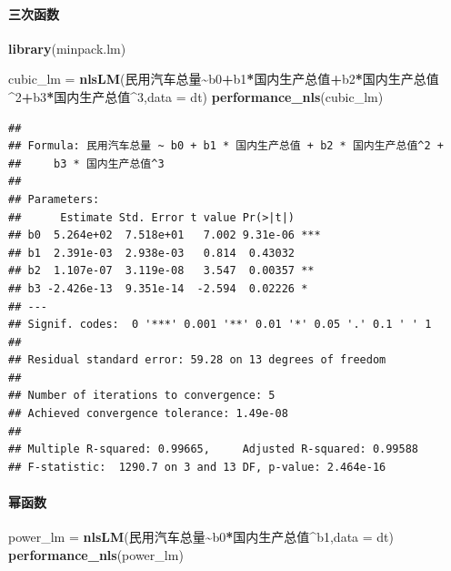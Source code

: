 \documentclass[
]{article}
\newenvironment{Shaded}{\begin{snugshade}}{\end{snugshade}}
\newcommand{\AttributeTok}[1]{\textcolor[rgb]{0.13,0.29,0.53}{#1}}
\newcommand{\DecValTok}[1]{\textcolor[rgb]{0.00,0.00,0.81}{#1}}
\newcommand{\FunctionTok}[1]{\textcolor[rgb]{0.13,0.29,0.53}{\textbf{#1}}}
\newcommand{\NormalTok}[1]{#1}
\newcommand{\OtherTok}[1]{\textcolor[rgb]{0.56,0.35,0.01}{#1}}
\newcommand{\SpecialCharTok}[1]{\textcolor[rgb]{0.81,0.36,0.00}{\textbf{#1}}}
\begin{document}
\paragraph{三次函数}\label{ux4e09ux6b21ux51fdux6570}

\begin{Shaded}
\begin{Highlighting}[]
\FunctionTok{library}\NormalTok{(minpack.lm)}

\NormalTok{cubic\_lm }\OtherTok{=} \FunctionTok{nlsLM}\NormalTok{(民用汽车总量}\SpecialCharTok{\textasciitilde{}}\NormalTok{b0}\SpecialCharTok{+}\NormalTok{b1}\SpecialCharTok{*}\NormalTok{国内生产总值}\SpecialCharTok{+}\NormalTok{b2}\SpecialCharTok{*}\NormalTok{国内生产总值}\SpecialCharTok{\^{}}\DecValTok{2}\SpecialCharTok{+}\NormalTok{b3}\SpecialCharTok{*}\NormalTok{国内生产总值}\SpecialCharTok{\^{}}\DecValTok{3}\NormalTok{,}\AttributeTok{data =}\NormalTok{ dt)}
\FunctionTok{performance\_nls}\NormalTok{(cubic\_lm)}
\end{Highlighting}
\end{Shaded}

\begin{verbatim}
## 
## Formula: 民用汽车总量 ~ b0 + b1 * 国内生产总值 + b2 * 国内生产总值^2 + 
##     b3 * 国内生产总值^3
## 
## Parameters:
##      Estimate Std. Error t value Pr(>|t|)    
## b0  5.264e+02  7.518e+01   7.002 9.31e-06 ***
## b1  2.391e-03  2.938e-03   0.814  0.43032    
## b2  1.107e-07  3.119e-08   3.547  0.00357 ** 
## b3 -2.426e-13  9.351e-14  -2.594  0.02226 *  
## ---
## Signif. codes:  0 '***' 0.001 '**' 0.01 '*' 0.05 '.' 0.1 ' ' 1
## 
## Residual standard error: 59.28 on 13 degrees of freedom
## 
## Number of iterations to convergence: 5 
## Achieved convergence tolerance: 1.49e-08
## 
## Multiple R-squared: 0.99665,     Adjusted R-squared: 0.99588 
## F-statistic:  1290.7 on 3 and 13 DF, p-value: 2.464e-16
\end{verbatim}

\paragraph{幂函数}\label{ux5e42ux51fdux6570}

\begin{Shaded}
\begin{Highlighting}[]
\NormalTok{power\_lm }\OtherTok{=} \FunctionTok{nlsLM}\NormalTok{(民用汽车总量}\SpecialCharTok{\textasciitilde{}}\NormalTok{b0}\SpecialCharTok{*}\NormalTok{国内生产总值}\SpecialCharTok{\^{}}\NormalTok{b1,}\AttributeTok{data =}\NormalTok{ dt)}
\FunctionTok{performance\_nls}\NormalTok{(power\_lm)}
\end{Highlighting}
\end{Shaded}
\end{document}
